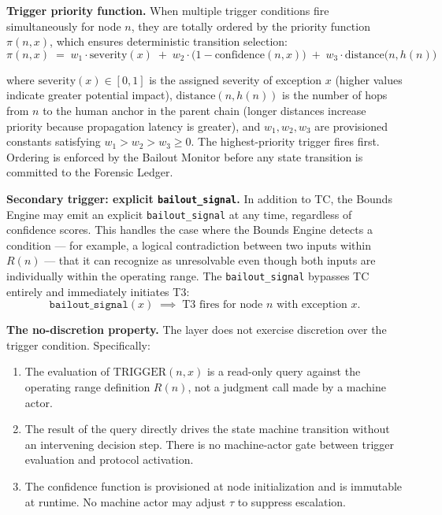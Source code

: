 \bigskip
\noindent\textbf{Trigger priority function.} When multiple trigger conditions fire simultaneously for node $n$, they are totally ordered by the priority function $\pi(n, x)$, which ensures deterministic transition selection:
\begin{equation}
\pi(n, x) \;=\; w_1 \cdot \text{severity}(x) \;+\; w_2 \cdot \bigl(1 - \text{confidence}(n, x)\bigr) \;+\; w_3 \cdot \text{distance}\bigl(n, h(n)\bigr) \tag{PF}
\end{equation}

where $\text{severity}(x) \in [0, 1]$ is the assigned severity of exception $x$ (higher values indicate greater potential impact), $\text{distance}(n, h(n))$ is the number of hops from $n$ to the human anchor in the parent chain (longer distances increase priority because propagation latency is greater), and $w_1, w_2, w_3$ are provisioned constants satisfying $w_1 > w_2 > w_3 \geq 0$. The highest-priority trigger fires first. Ordering is enforced by the Bailout Monitor before any state transition is committed to the Forensic Ledger.

\bigskip
\noindent\textbf{Secondary trigger: explicit \texttt{bailout\_signal}.} In addition to TC, the Bounds Engine may emit an explicit \texttt{bailout\_signal} at any time, regardless of confidence scores. This handles the case where the Bounds Engine detects a condition --- for example, a logical contradiction between two inputs within $R(n)$ --- that it can recognize as unresolvable even though both inputs are individually within the operating range. The \texttt{bailout\_signal} bypasses TC entirely and immediately initiates T3:
\begin{equation}
\texttt{bailout\_signal}(x) \;\implies\; \text{T3 fires for node } n \text{ with exception } x. \tag{TC-secondary}
\end{equation}

\bigskip
\noindent\textbf{The no-discretion property.} The \bounds{} layer does not exercise discretion over the trigger condition. Specifically:

\begin{enumerate}
    \item The evaluation of $\text{TRIGGER}(n, x)$ is a read-only query against the operating range definition $R(n)$, not a judgment call made by a machine actor.
    \item The result of the query directly drives the state machine transition without an intervening decision step. There is no machine-actor gate between trigger evaluation and protocol activation.
    \item The confidence function is provisioned at node initialization and is immutable at runtime. No machine actor may adjust $\tau$ to suppress escalation.
\end{enumerate}

